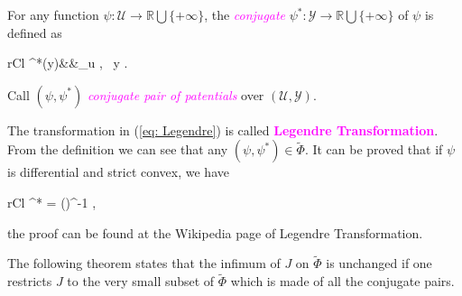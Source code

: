 \begin{definition}
	For any function $\psi: \mathcal{U} \longrightarrow \mathbb{R}\bigcup\{+\infty\}$, the \textit{\textcolor{magenta}{conjugate}} $\psi^*: \mathcal{Y} \longrightarrow \mathbb{R}\bigcup\{+\infty\}$ of $\psi$ is defined as
	\begin{IEEEeqnarray}{rCl}
		\psi^{*}(y)&\triangleq&\sup _{u \in {}}, \ y \in {} \label{eq: Legendre}.
	\end{IEEEeqnarray}
	Call $(\psi, \psi^*)$ \textit{\textcolor{magenta}{conjugate pair of patentials}} over $(\mathcal{U}, \mathcal{Y})$.
\end{definition}
\begin{remark}
	The transformation in (\ref{eq: Legendre}) is called \textcolor{magenta}{\bf Legendre Transformation}. From the definition we can see that any $(\psi, \psi^*) \in \tilde{\Phi}$. It can be proved that if $\psi$ is differential and strict convex, we have 
	\begin{IEEEeqnarray}{rCl}
		\nabla\psi^* = (\nabla\psi)^{-1} \label{eq: inverse},
	\end{IEEEeqnarray}
	the proof can be found at the Wikipedia page of Legendre Transformation. 
\end{remark}

The following theorem states that the infimum of $J$ on $\tilde{\Phi}$ is unchanged if one restricts $J$ to the very small subset of $\tilde{\Phi}$ which is made of all the conjugate pairs.

